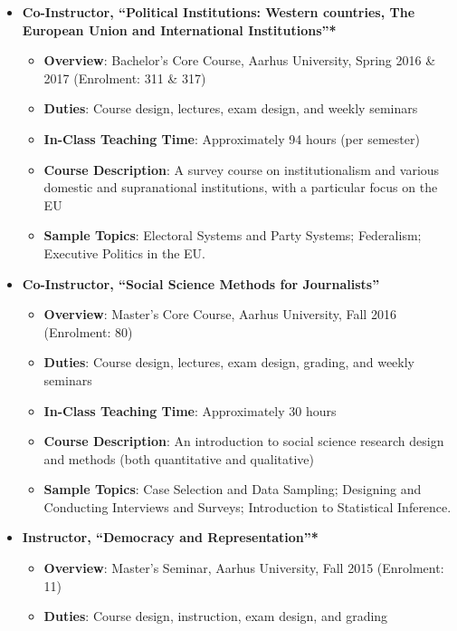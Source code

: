 \documentclass[11pt]{article}
\begin{document}
	\begin{itemize}[noitemsep]
		\item \textbf{Co-Instructor, “Political Institutions: Western countries, The European Union and International Institutions”*}\\[-4ex]
		\begin{itemize}[noitemsep]
			\item \textbf{Overview}: Bachelor’s Core Course, Aarhus University, Spring 2016 \& 2017 (Enrolment: 311 \& 317)
			\item \textbf{Duties}: Course design, lectures, exam design, and weekly seminars
        	\item \textbf{In-Class Teaching Time}: Approximately 94 hours (per semester)
			\item \textbf{Course Description}: A survey course on institutionalism and various domestic and supranational institutions, with a particular focus on the EU
			\item \textbf{Sample Topics}: Electoral Systems and Party Systems; Federalism; Executive Politics in the EU.
		\end{itemize}
		\item \textbf{Co-Instructor, “Social Science Methods for Journalists”}\\[-4ex]
		\begin{itemize}[noitemsep]
			\item \textbf{Overview}: Master’s Core Course, Aarhus University, Fall 2016 (Enrolment: 80)
			\item \textbf{Duties}: Course design, lectures, exam design, grading, and weekly seminars
          	\item \textbf{In-Class Teaching Time}: Approximately 30 hours
			\item \textbf{Course Description}: An introduction to social science research design and methods (both quantitative and qualitative)
			\item \textbf{Sample Topics}: Case Selection and Data Sampling; Designing and Conducting Interviews and Surveys; Introduction to Statistical Inference.
		\end{itemize}
		\item \textbf{Instructor, “Democracy and Representation”*}\\[-4ex]
		\begin{itemize}[noitemsep]
			\item \textbf{Overview}: Master’s Seminar, Aarhus University, Fall 2015 (Enrolment: 11)
			\item \textbf{Duties}: Course design, instruction, exam design, and grading

\end{itemize}
\end{itemize}
\end{document}
